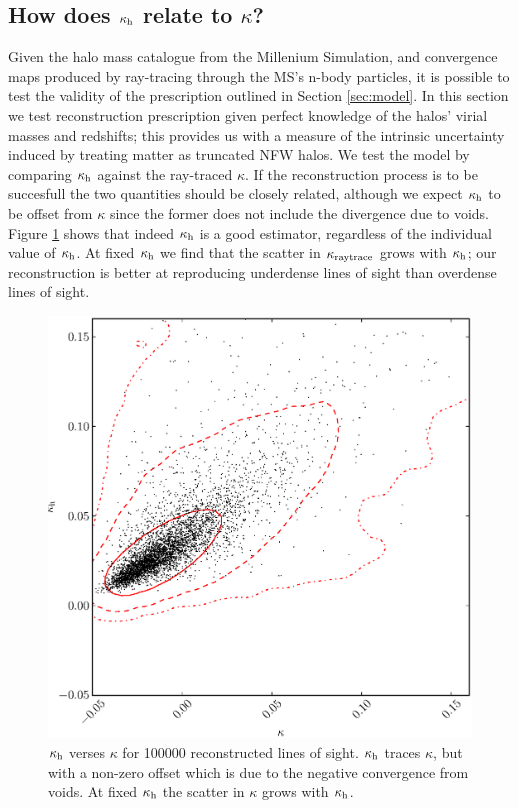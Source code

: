 \documentclass[useAMS,usenatbib]{mn2e}
\begin{document}
\subsection{How does $\kappa_{\rm h}$ relate to $\kappa$?}

Given the halo mass catalogue from the Millenium Simulation, 
and convergence maps produced by ray-tracing through the MS's n-body particles, 
it is possible to test the validity of the prescription outlined
in Section \ref{sec:model}. In this section we test reconstruction prescription given perfect
knowledge of the halos' virial masses and redshifts; this provides us with a measure of the intrinsic uncertainty induced by treating matter as truncated NFW halos. 
We test the model by comparing $\kappa_{\rm h}$ against
the ray-traced $\kappa$. If the reconstruction process is to be
succesfull the two quantities should be closely related, although
we expect $\kappa_{\rm h}$ to be offset from $\kappa$ since the former 
does not include the divergence due to voids. Figure \ref{fig:isitbiased} shows that indeed $\kappa_{\rm h}$ is a good estimator, regardless of the individual value of $\kappa_{\rm h}$. At fixed $\kappa_{\rm h}$ we find that the scatter in $\kappa_{\rm raytrace}$ grows with $\kappa_{\rm h}$; our reconstruction is better at reproducing underdense lines of sight than overdense lines of sight.

\begin{figure}
\includegraphics[width=\columnwidth]{figs/cornerplot.eps}
\caption[Biased?]{$\kappa_{\rm h}$ verses $\kappa$ for 100000 reconstructed lines of sight. $\kappa_{\rm h}$ traces $\kappa$, but with a non-zero offset which is due to the negative convergence from voids. At fixed $\kappa_{\rm h}$ the scatter in $\kappa$ grows with $\kappa_{\rm h}$.}
\label{fig:isitbiased}
\end{figure}
\end{document}
